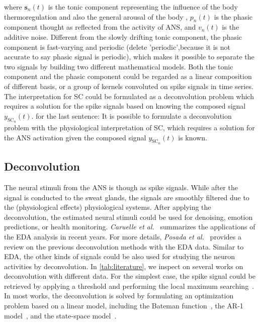 \documentclass[10pt,conference]{ieeeconf}
\providecommand{\rm}{\mathrm}
\begin{document}
where $\mathbf{s}_n(t)$ is the tonic component representing the influence of the body thermoregulation {\color{red}and also the general arousal of the body} , $p_n(t)$ is the phasic component thought as reflected from the activity of ANS, and $v_n(t)$ is the additive noise. Different from the slowly drifting tonic component, the phasic component is fast-varying and periodic {\color{red}(delete 'periodic',because it is not accurate to say phasic signal is periodic)}, which makes it possible to separate the two signals by building two different mathematical models. Both the tonic component and the phasic component could be regarded as a linear composition of different basis, or a group of kernels convoluted on spike signals in time series. The interpretation for SC could be formulated as a deconvolution problem which requires a solution for the spike signals based on knowing the composed signal $y_{\rm{SC}_n}(t)$. {\color{red}for the last sentence: It is possible to formulate a deconvolution problem with the physiological interpretation of SC, which requires a solution for the ANS activation given the composed signal  $y_{\rm{SC}_n}(t)$  is known.  }

\subsection{Deconvolution}

The neural stimuli from the ANS is though as spike signals. While after the signal is conducted to the sweat glands, the signals are smoothly filtered due to the (physiological effects) {\color{red} physiological systems}. After applying the deconvolution, the estimated neural stimuli could be used for denoising, emotion predictions, or health monitoring. \textit{Caruelle et al.}~\cite{caruelle2019use} summarizes the applications of the EDA analysis in recent years. For more details, \textit{Posada et al.}~\cite{posada2020innovations} provides a review on the previous deconvolution methods with the EDA data. Similar to EDA, the other kinds of signals could be also used for studying the neuron activities by deconvolution. In \cref{tab:literature}, we inspect on several works on deconvolution with different data. For the simplest case, the spike signal could be retrieved by applying a threshold and performing the local maximum searching~\cite{kaur2016remote,subramanian2019systematic}. In most works, the deconvolution is solved by formulating an optimization problem based on a linear model, including the Bateman function~\cite{savazzi2019estimation,greco2014electrodermal,greco2015cvxeda,amin2019tonic,hernando2017feature,wickramasuriya2019skin}, the AR-1 model~\cite{friedrich2017fast}, and the state-space model~\cite{kazemipour2017fast,amin2019robust}. 
\end{document}

